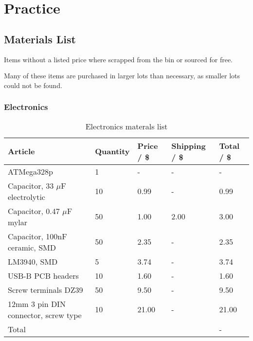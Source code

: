 \documentclass[11pt,fleqn,openany]{book} %
\begin{document}

\part{Practice}



\chapter{Materials List}

Items without a listed price where scrapped from the bin or sourced for free.

Many of these items are purchased in larger lots than necessary, as smaller lots could not be found.

\section{Electronics}

\begin{table}[ht!]
\centering
\begin{tabular}{l l l l l}
\toprule
Article & Quantity & Price / \$ & Shipping / \$ & Total / \$\\
\midrule
ATMega328p & 1 & - & - & - \\
Capacitor, 33 $\mu$F electrolytic & 10 & 0.99 & - & 0.99 \\
Capacitor, 0.47 $\mu$F mylar & 50 & 1.00 & 2.00 & 3.00 \\
Capacitor, 100nF ceramic, SMD & 50 & 2.35 & - & 2.35 \\
LM3940, SMD & 5 & 3.74 & - & 3.74 \\
USB-B PCB headers & 10 & 1.60 & - & 1.60 \\
Screw terminals DZ39 & 50 & 9.50 & - & 9.50 \\
12mm 3 pin DIN connector, screw type & 10 & 21.00 & - & 21.00 \\
\bottomrule
Total & & & & -\\
\end{tabular}
\caption{Electronics materals list}
\end{table}
\end{document}
